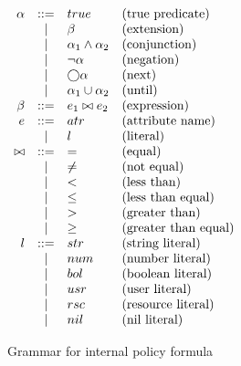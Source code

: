 \begin{table}[!ht]
    \centering
    $
    \begin{array}{rcll}
        \alpha     & ::=   & true              & \text{(true predicate)} \\
                & |     & \beta              & \text{(extension)} \\
                & |     & \alpha_1 \land \alpha_2 & \text{(conjunction)} \\
                & |     & \neg \alpha          & \text{(negation)} \\
                & |     & \bigcirc \alpha            & \text{(next)} \\
                & |     & \alpha_1 \cup \alpha_2    & \text{(until)} \\
        \beta    & ::=   & e_1 \bowtie e_2   & \text{(expression)} \\
        e       & ::=   & atr               & \text{(attribute name)} \\
                & |     & l                 & \text{(literal)} \\
        \bowtie & ::=   & =                 & \text{(equal)} \\
                & |     & \neq              & \text{(not equal)} \\
                & |     & <                 & \text{(less than)} \\
                & |     & \leq              & \text{(less than equal)} \\
                & |     & >                 & \text{(greater than)} \\
                & |     & \geq              & \text{(greater than equal)} \\
        l       & ::=   & str               & \text{(string literal)} \\
                & |     & num               & \text{(number literal)} \\
                & |     & bol               & \text{(boolean literal)} \\
                & |     & usr               & \text{(user literal)} \\
                & |     & rsc               & \text{(resource literal)} \\
                & |     & nil               & \text{(nil literal)}
    \end{array}
    $
    \caption{Grammar for internal policy formula}
    \label{tab:pf-grammar}
\end{table}
